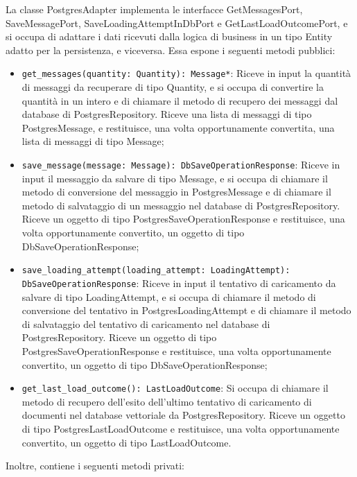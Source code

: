 \label{sec:postgres_adapter}
La classe PostgresAdapter implementa le interfacce GetMessagesPort, SaveMessagePort, SaveLoadingAttemptInDbPort e GetLastLoadOutcomePort, e si occupa di adattare i dati ricevuti dalla logica di business in un tipo Entity adatto per la persistenza, e viceversa. Essa espone i seguenti metodi pubblici:
\begin{itemize}
    \item \texttt{get\_messages(quantity: Quantity): Message*}: Riceve in input la quantità di messaggi da recuperare di tipo Quantity, e si occupa di convertire la quantità in un intero e di chiamare il metodo di recupero dei messaggi dal database di PostgresRepository. Riceve una lista di messaggi di tipo PostgresMessage, e restituisce, una volta opportunamente convertita, una lista di messaggi di tipo Message;
    \item \texttt{save\_message(message: Message): DbSaveOperationResponse}: Riceve in input il messaggio da salvare di tipo Message, e si occupa di chiamare il metodo di conversione del messaggio in PostgresMessage e di chiamare il metodo di salvataggio di un messaggio nel database di PostgresRepository. Riceve un oggetto di tipo PostgresSaveOperationResponse e restituisce, una volta opportunamente convertito, un oggetto di tipo DbSaveOperationResponse;
    \item \texttt{save\_loading\_attempt(loading\_attempt: LoadingAttempt): DbSaveOperationResponse}: Riceve in input il tentativo di caricamento da salvare di tipo LoadingAttempt, e si occupa di chiamare il metodo di conversione del tentativo in PostgresLoadingAttempt e di chiamare il metodo di salvataggio del tentativo di caricamento nel database di PostgresRepository. Riceve un oggetto di tipo PostgresSaveOperationResponse e restituisce, una volta opportunamente convertito, un oggetto di tipo DbSaveOperationResponse;
    \item \texttt{get\_last\_load\_outcome(): LastLoadOutcome}: Si occupa di chiamare il metodo di recupero dell'esito dell'ultimo tentativo di caricamento di documenti nel database vettoriale da PostgresRepository. Riceve un oggetto di tipo PostgresLastLoadOutcome e restituisce, una volta opportunamente convertito, un oggetto di tipo LastLoadOutcome.
\end{itemize}
Inoltre, contiene i seguenti metodi privati:
